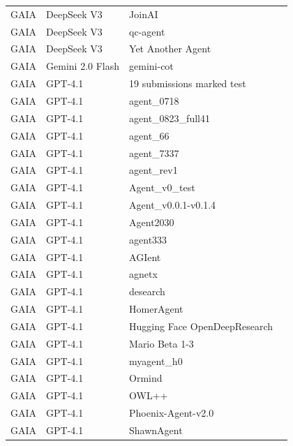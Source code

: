 \begin{longtable}{p{2cm}p{3cm}p{5cm}p{3cm}}
  GAIA & DeepSeek V3 & JoinAI & \cite{mialon_gaia_2023} \\
  GAIA & DeepSeek V3 & qc-agent & \cite{mialon_gaia_2023} \\
  GAIA & DeepSeek V3 & Yet Another Agent & \cite{mialon_gaia_2023} \\
  GAIA & Gemini 2.0 Flash & gemini-cot & \cite{mialon_gaia_2023} \\
  GAIA & GPT-4.1 & 19 submissions marked test & \cite{mialon_gaia_2023} \\
  GAIA & GPT-4.1 & agent\_0718 & \cite{mialon_gaia_2023} \\
  GAIA & GPT-4.1 & agent\_0823\_full41 & \cite{mialon_gaia_2023} \\
  GAIA & GPT-4.1 & agent\_66 & \cite{mialon_gaia_2023} \\
  GAIA & GPT-4.1 & agent\_7337 & \cite{mialon_gaia_2023} \\
  GAIA & GPT-4.1 & agent\_rev1 & \cite{mialon_gaia_2023} \\
  GAIA & GPT-4.1 & Agent\_v0\_test & \cite{mialon_gaia_2023,noah_maccallum_gpt-41_2025} \\
  GAIA & GPT-4.1 & Agent\_v0.0.1-v0.1.4 & \cite{mialon_gaia_2023} \\
  GAIA & GPT-4.1 & Agent2030 & \cite{mialon_gaia_2023} \\
  GAIA & GPT-4.1 & agent333 & \cite{mialon_gaia_2023} \\
  GAIA & GPT-4.1 & AGIent & \cite{mialon_gaia_2023} \\
  GAIA & GPT-4.1 & agnetx & \cite{mialon_gaia_2023} \\
  GAIA & GPT-4.1 & desearch & \cite{mialon_gaia_2023} \\
  GAIA & GPT-4.1 & HomerAgent & \cite{mialon_gaia_2023} \\
  GAIA & GPT-4.1 & Hugging Face OpenDeepResearch & \cite{deshpande_trail_2025} \\
  GAIA & GPT-4.1 & Mario Beta 1-3 & \cite{mialon_gaia_2023} \\
  GAIA & GPT-4.1 & myagent\_h0 & \cite{mialon_gaia_2023} \\
  GAIA & GPT-4.1 & Ormind & \cite{mialon_gaia_2023,noauthor_ormind_nodate} \\
  GAIA & GPT-4.1 & OWL++ & \cite{mialon_gaia_2023} \\
  GAIA & GPT-4.1 & Phoenix-Agent-v2.0 & \cite{mialon_gaia_2023} \\
  GAIA & GPT-4.1 & ShawnAgent & \cite{mialon_gaia_2023} \\

\end{longtable}
